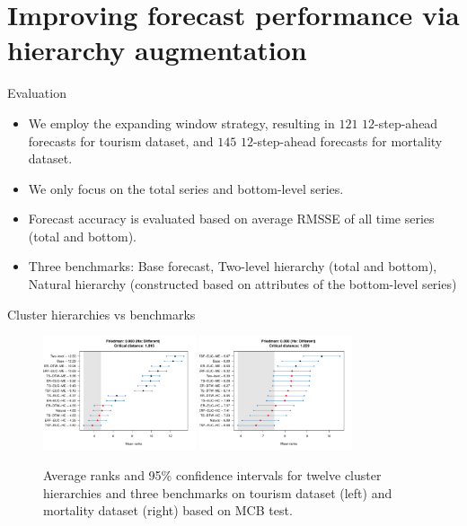 \documentclass[aspectratio=169]{beamer}
\begin{document}
\section{Improving forecast performance via hierarchy augmentation}

\begin{frame}{Evaluation}

	\begin{itemize}
		\item We employ the expanding window strategy, resulting in $121$ $12$-step-ahead forecasts for tourism dataset, and $145$ $12$-step-ahead forecasts for mortality dataset.
		\item We only focus on the total series and bottom-level series.
		\item Forecast accuracy is evaluated based on average RMSSE of all time series (total and bottom).
		\item {\color{red} Three benchmarks}: Base forecast, Two-level hierarchy (total and bottom), Natural hierarchy (constructed based on attributes of the bottom-level series)
	\end{itemize}
	
\end{frame}

\begin{frame}{Cluster hierarchies vs benchmarks}
	
	\begin{figure}
		\centering
		\includegraphics[width=0.4\textwidth]{../manuscript/figures/hierarchy_rmsse/tourism/P3_mcb_benchmarks_h12.pdf}
		\includegraphics[width=0.4\textwidth]{../manuscript/figures/hierarchy_rmsse/mortality/P3_mcb_benchmarks_h12.pdf}
		\caption{Average ranks and 95\% confidence intervals for twelve cluster hierarchies and three benchmarks on tourism dataset (left) and mortality dataset (right) based on MCB test.}
	\end{figure}

\end{frame}
\end{document}
